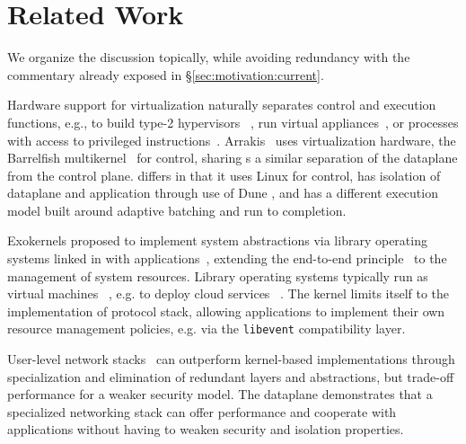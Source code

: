 

\section{Related Work}
\label{sec:related}

We organize the discussion topically, while avoiding redundancy with
the commentary already exposed in \S\ref{sec:motivation:current}.


 Hardware support for
virtualization naturally separates control and execution functions,
e.g., to build type-2 hypervisors
~\cite{DBLP:journals/tocs/BugnionDRSW12,misc/kivity07kvm}, run virtual
appliances~\cite{DBLP:conf/lisa/SapuntzakisBCZCLR03}, or processes
with access to privileged instructions~\cite{belay2012dune}.
Arrakis~\cite{peter2013arrakis,arrakisTR13} uses virtualization
hardware, the Barrelfish
multikernel~\cite{DBLP:conf/sosp/BaumannBDHIPRSS09} for control, sharing
s a similar separation of the dataplane from the control
plane. \ix differs in that it uses Linux for
control, has isolation of dataplane and application through use of Dune ,
and has a different execution model built around adaptive batching and run to completion.


Exokernels proposed to implement system abstractions via library
operating systems linked in with
applications~\cite{DBLP:conf/sosp/EnglerKO95}, extending the
end-to-end principle~\cite{DBLP:journals/tocs/SaltzerRC84} to the
management of system resources.  Library operating systems typically
run as virtual machines ~\cite{DBLP:journals/tocs/BugnionDGR97},
e.g. to deploy cloud services
~\cite{DBLP:conf/asplos/MadhavapeddyMRSSGSHC13}. The \ix kernel limits
itself to the implementation of protocol stack, allowing applications
to implement their own resource management policies, e.g. via the
\texttt{libevent} compatibility layer.


 User-level network
stacks~\cite{jeong2014mtcp, marinos2013network, openonload} can
outperform kernel-based implementations through specialization and
elimination of redundant layers and abstractions, but trade-off
performance for a weaker security model.  The \ix dataplane
demonstrates that a specialized networking stack can offer performance
and cooperate with applications without having to weaken security and
isolation properties.
 


